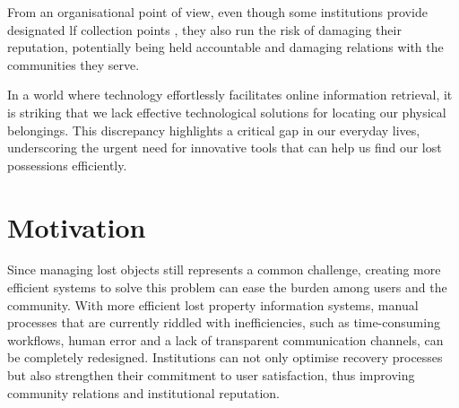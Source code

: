 From an organisational point of view, even though some institutions provide designated \ac{lf} collection points \cite{Tan2023}, they also run the risk of damaging their reputation, potentially being held accountable and damaging relations with the communities they serve.

In a world where technology effortlessly facilitates online information retrieval, it is striking that we lack effective technological solutions for locating our physical belongings. This discrepancy highlights a critical gap in our everyday lives, underscoring the urgent need for innovative tools that can help us find our lost possessions efficiently.

\section{Motivation}

Since managing lost objects still represents a common challenge, creating more efficient systems to solve this problem can ease the burden among users and the community. With more efficient lost property information systems, manual processes that are currently riddled with inefficiencies, such as time-consuming workflows, human error and a lack of transparent communication channels, can be completely redesigned. Institutions can not only optimise recovery processes but also strengthen their commitment to user satisfaction, thus improving community relations and institutional reputation.

